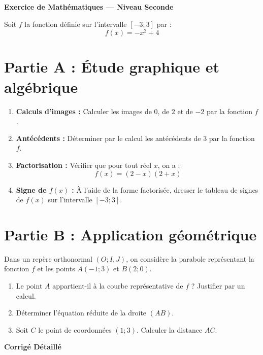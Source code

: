 \documentclass[11pt,a4paper]{article}
\begin{document}
\begin{center}
\textbf{\Large Exercice de Mathématiques — Niveau Seconde}
\end{center}

\vspace{0.5cm}

Soit $f$ la fonction définie sur l'intervalle $[-3 ; 3]$ par :
$$f(x) = -x^2 + 4$$

\section*{Partie A : Étude graphique et algébrique}
\begin{enumerate}
    \item \textbf{Calculs d'images :} Calculer les images de $0$, de $2$ et de $-2$ par la fonction $f$.
    \item \textbf{Antécédents :} Déterminer par le calcul les antécédents de $3$ par la fonction $f$.
    \item \textbf{Factorisation :} Vérifier que pour tout réel $x$, on a : 
    $$f(x) = (2 - x)(2 + x)$$
    \item \textbf{Signe de $f(x)$ :} À l'aide de la forme factorisée, dresser le tableau de signes de $f(x)$ sur l'intervalle $[-3 ; 3]$.
\end{enumerate}

\section*{Partie B : Application géométrique}
Dans un repère orthonormal $(O ; I, J)$, on considère la parabole représentant la fonction $f$ et les points $A(-1 ; 3)$ et $B(2 ; 0)$.
\begin{enumerate}
    \item Le point $A$ appartient-il à la courbe représentative de $f$ ? Justifier par un calcul.
    \item Déterminer l'équation réduite de la droite $(AB)$.
    \item Soit $C$ le point de coordonnées $(1 ; 3)$. Calculer la distance $AC$.
\end{enumerate}

\vspace{1cm}
\begin{center}
\textbf{\large Corrigé Détaillé}
\end{center}
\end{document}
